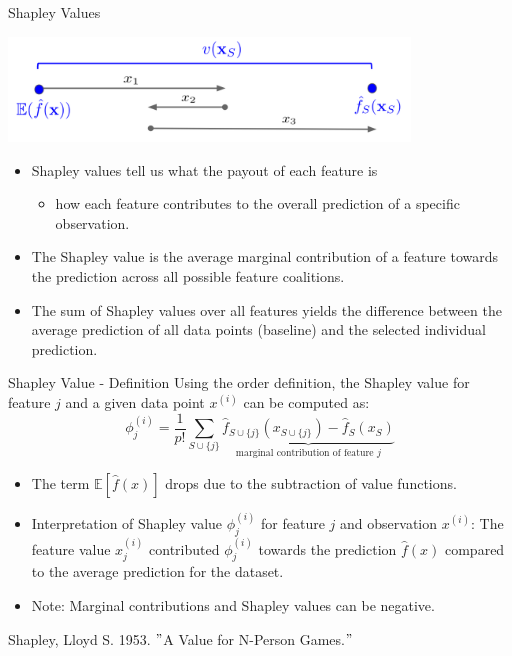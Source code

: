\documentclass[aspectratio=169]{../latex_main/tntbeamer}  %
\begin{document}
\begin{frame}{Shapley Values}

\begin{center}
\vspace{-0.3cm}
\includegraphics[width=0.8\textwidth]{figure/shapley_valuefct}
\end{center}

\begin{itemize}
     \item Shapley values tell us what the payout of each feature is
     \begin{itemize}
         \item how each feature contributes to the overall prediction of a specific observation.
     \end{itemize}
     \pause
     \item The Shapley value is the average marginal contribution of a feature towards the prediction \alert{across all possible feature coalitions}.
     \pause
     \item The sum of Shapley values over all features yields the difference between the average prediction of all data points (baseline) and the selected individual prediction.
     \end{itemize}
\end{frame}

\begin{frame}{Shapley Value - Definition }
  Using the order definition, the Shapley value for feature $j$ and a given data point $x^{(i)}$ can be computed as:
     $$ \phi^{(i)}_j  = \frac{1}{p!} \sum_{S \cup \{j\}} \underbrace{\hat{f}_{S \cup \{j\}}(x_{S \cup \{j\}}) - \hat{f}_{S}(x_{S})}_{\text{marginal contribution of feature $j$}} $$
\begin{itemize}
    \item The term $\mathbb{E}[\hat{f}(x)]$ drops due to the subtraction of value functions.
  \item Interpretation of Shapley value $\phi^{(i)}_j$ for feature $j$ and observation $x^{(i)}$:
  The feature value $x^{(i)}_{j}$ contributed $\phi^{(i)}_j$ towards the prediction $\hat{f}(x)$ compared to the average prediction for the dataset.
  \pause
   \item Note: Marginal contributions and Shapley values can be negative.
\end{itemize}
\tiny
\vfill
Shapley, Lloyd S. 1953. $"$A Value for N-Person Games.$"$\\
\end{frame}
\end{document}
